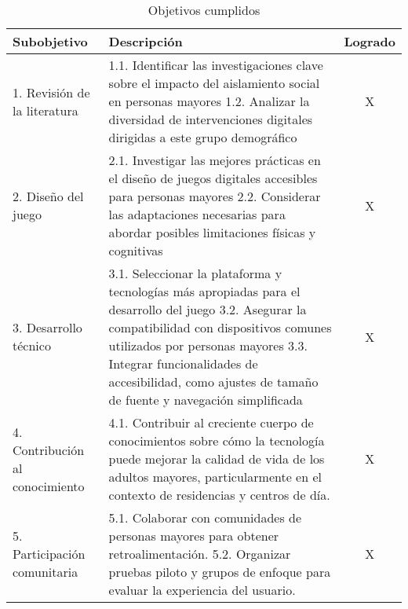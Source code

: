 \begin{table}[H]
	\centering
	\begin{tabular}{| p{3.5cm} | p{9.6cm} | c |}
		\hline
		\rowcolor{lightgray}
		\textbf{Subobjetivo} & \textbf{Descripción} & \textbf{Logrado}\\
		\hline
		1. Revisión de la literatura & 
		1.1. Identificar las investigaciones clave sobre el impacto del aislamiento social en personas mayores \newline
		\vspace{0.2cm}
		1.2. Analizar la diversidad de intervenciones digitales dirigidas a este grupo demográfico \vspace{0.2cm}
		& X \\
		\hline
		2. Diseño del juego &
		2.1. Investigar las mejores prácticas en el diseño de juegos digitales accesibles para personas mayores \newline
		\vspace{0.2cm}
		2.2. Considerar las adaptaciones necesarias para abordar posibles limitaciones físicas y cognitivas
		\vspace{0.2cm} & X \\
		\hline
		3. Desarrollo técnico & 
		3.1. Seleccionar la plataforma y tecnologías más apropiadas para el desarrollo del juego \newline
		\vspace{0.2cm}
		3.2. Asegurar la compatibilidad con dispositivos comunes utilizados por personas mayores \newline
		\vspace{0.2cm}
		3.3. Integrar funcionalidades de accesibilidad, como ajustes de tamaño de fuente y navegación simplificada \vspace{0.2cm} & X \\
		\hline
		4. Contribución al conocimiento & 
		4.1. Contribuir al creciente cuerpo de conocimientos sobre cómo la tecnología puede mejorar la calidad de vida de los adultos mayores, particularmente en el contexto de residencias y centros de día. 
		\vspace{0.2cm} & X \\
		\hline
		5. Participación comunitaria & 
		5.1. Colaborar con comunidades de personas mayores para obtener retroalimentación. \newline
		\vspace{0.2cm}
		5.2. Organizar pruebas piloto y grupos de enfoque para evaluar la experiencia del usuario. \vspace{0.2cm} & X \\
		\hline
	\end{tabular}
	\caption{Objetivos cumplidos}
	\label{tab:objetivos-cumplidos}
\end{table}


